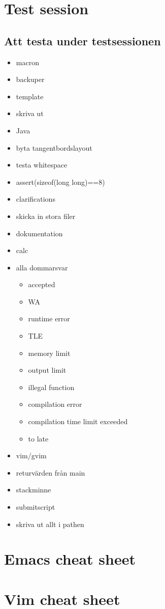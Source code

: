
\appendix

\chapter{Test session}

\section{Att testa under testsessionen}
\begin{itemize}
	\item macron
	\item backuper
	\item template
	\item skriva ut
	\item Java
	\item byta tangentbordslayout
	\item testa whitespace
	\item assert(sizeof(long long)==8)
	\item clarifications
	\item skicka in stora filer
	\item dokumentation
	\item calc
	\item alla dommarsvar
	\begin{itemize}
 			\item accepted
 			\item WA
 			\item runtime error
 			\item TLE
 			\item memory limit
 			\item output limit
 			\item illegal function
 			\item compilation error
 			\item compilation time limit exceeded
 			\item to late
		\end{itemize}
	\item vim/gvim
	\item returvärden från main
	\item stackminne
	\item submitscript
	\item skriva ut allt i pathen
\end{itemize}

\chapter{Emacs cheat sheet}

\chapter{Vim cheat sheet}
